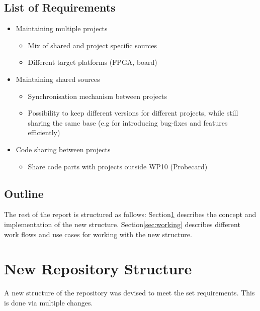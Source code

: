 \documentclass{scrartcl}
\begin{document}
\subsection{List of Requirements}
\begin{itemize}
\item Maintaining multiple projects
\begin{itemize}
\item Mix of shared and project specific sources
\item Different target platforms (FPGA, board)
\end{itemize}
\item Maintaining shared sources
  \begin{itemize}
  \item Synchronisation mechanism between projects
  \item Possibility to keep different versions for different projects,
    while still sharing the same base (e.g for introducing bug-fixes
    and features efficiently)
  \end{itemize}
\item Code sharing between projects
\begin{itemize}
\item Share code parts with projects outside WP10 (Probecard)
\end{itemize}
\end{itemize}

\subsection{Outline}
The rest of the report is structured as follows: Section\ref{sec:structure} describes the concept and implementation of the
new structure. Section\ref{sec:working} describes different work
flows and use cases for working with the new structure.

\section{New Repository Structure}
\label{sec:structure}
A new structure of the repository was devised to meet the set
requirements. This is done via multiple changes.
\end{document}
